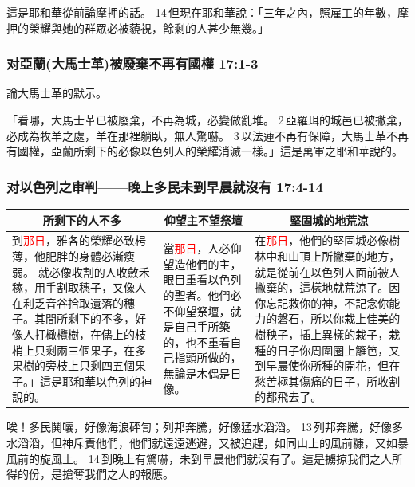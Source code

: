 這是耶和華從前論摩押的話。 14 但現在耶和華說：「三年之內，照雇工的年數，摩押的榮耀與她的群眾必被藐視，餘剩的人甚少無幾。」


\subsubsection{对亞蘭(大馬士革)被廢棄不再有國權 17:1-3}
論大馬士革的默示。

「看哪，大馬士革已被廢棄，不再為城，必變做亂堆。 2 亞羅珥的城邑已被撇棄，必成為牧羊之處，羊在那裡躺臥，無人驚嚇。 3 以法蓮不再有保障，大馬士革不再有國權，亞蘭所剩下的必像以色列人的榮耀消滅一樣。」這是萬軍之耶和華說的。

\subsubsection{对以色列之审判——晚上多民未到早晨就沒有 17:4-14}
\begin{table}[H]
\centering
\begin{tabular}{p{6.5cm}|p{3.50cm}|p{7.0cm}}\hline\hline
\multicolumn{1}{c|}{所剩下的人不多}&\multicolumn{1}{c|}{仰望主不望祭壇}&\multicolumn{1}{c}{堅固城的地荒涼}\\\hline
到\textcolor{red}{那日}，雅各的榮耀必致枵薄，他肥胖的身體必漸瘦弱。 就必像收割的人收斂禾稼，用手割取穗子，又像人在利乏音谷拾取遺落的穗子。其間所剩下的不多，好像人打橄欖樹，在儘上的枝梢上只剩兩三個果子，在多果樹的旁枝上只剩四五個果子。」這是耶和華以色列的神說的。 
&當\textcolor{red}{那日}，人必仰望造他們的主，眼目重看以色列的聖者。他們必不仰望祭壇，就是自己手所築的，也不重看自己指頭所做的，無論是木偶是日像。 
&在\textcolor{red}{那日}，他們的堅固城必像樹林中和山頂上所撇棄的地方，就是從前在以色列人面前被人撇棄的，這樣地就荒涼了。因你忘記救你的神，不記念你能力的磐石，所以你栽上佳美的樹秧子，插上異樣的栽子，栽種的日子你周圍圈上籬笆，又到早晨使你所種的開花，但在愁苦極其傷痛的日子，所收割的都飛去了。\\\hline
\end{tabular}
\end{table}

唉！多民鬨嚷，好像海浪砰訇；列邦奔騰，好像猛水滔滔。 13 列邦奔騰，好像多水滔滔，但神斥責他們，他們就遠遠逃避，又被追趕，如同山上的風前糠，又如暴風前的旋風土。 14 到晚上有驚嚇，未到早晨他們就沒有了。這是擄掠我們之人所得的份，是搶奪我們之人的報應。


